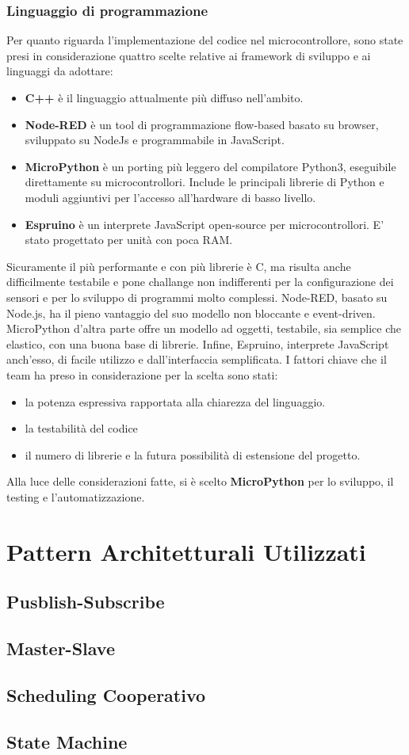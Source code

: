         \subsubsection{Linguaggio di programmazione}
        Per quanto riguarda l'implementazione del codice nel microcontrollore, sono state presi in considerazione quattro scelte relative ai framework di sviluppo e ai linguaggi da adottare: 
        \begin{itemize}
            \item \textbf{C++} è il linguaggio attualmente più diffuso nell'ambito. 
            \item \textbf{Node-RED} è un tool di programmazione flow-based basato su browser, sviluppato su NodeJs e programmabile in JavaScript.
            \item \textbf{MicroPython} è un porting più leggero del compilatore Python3, eseguibile direttamente su microcontrollori. Include le principali librerie di Python e moduli aggiuntivi per l'accesso all'hardware di basso livello.
            \item \textbf{Espruino} è un interprete JavaScript open-source per microcontrollori. E' stato progettato per unità con poca RAM.
        \end{itemize}
        Sicuramente il più performante e con più librerie è C, ma risulta anche difficilmente testabile e pone challange non indifferenti per la configurazione dei sensori e per lo sviluppo di programmi molto complessi. Node-RED, basato su Node.js, ha il pieno vantaggio del suo modello non bloccante e event-driven. MicroPython d'altra parte offre un modello ad oggetti, testabile, sia semplice che elastico, con una buona base di librerie. Infine, Espruino, interprete JavaScript anch'esso, di facile utilizzo e dall'interfaccia semplificata. 
        I fattori chiave che il team ha preso in considerazione per la scelta sono stati: 
        \begin{itemize}
            \item la potenza espressiva rapportata alla chiarezza del linguaggio. 
            \item la testabilità del codice
            \item il numero di librerie e la futura possibilità di estensione del progetto.
        \end{itemize}
        Alla luce delle considerazioni fatte, si è scelto \textbf{MicroPython} per lo sviluppo, il testing e l'automatizzazione.

    \section{Pattern Architetturali Utilizzati}
        \subsection{Pusblish-Subscribe}
        
        \subsection{Master-Slave}
        \subsection{Scheduling Cooperativo}
        \subsection{State Machine}
    